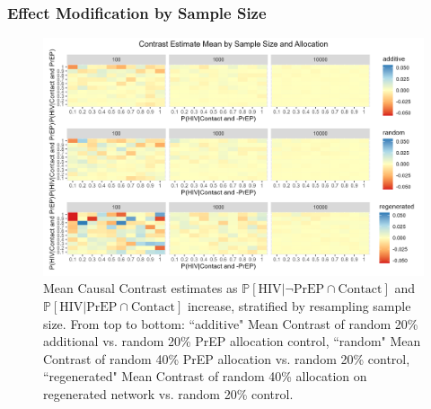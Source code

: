 \documentclass{article}
\theoremstyle{definition}
\begin{document}
\subsubsection{Effect Modification by Sample Size}
\begin{figure}[H]
    \centering
    \includegraphics[width=\linewidth]{Figures/Sample size Mean plots.png}
    \caption{Mean Causal Contrast estimates as $\mathbb{P}\left[\text{HIV} \vert \neg \text{PrEP} \cap \text{Contact}\right]$ and $\mathbb{P}\left[\text{HIV} \vert \text{PrEP} \cap \text{Contact}\right]$ increase, stratified by resampling sample size. From top to bottom: ``additive" Mean Contrast of random 20\% additional vs. random 20\% PrEP allocation control, ``random" Mean Contrast of random 40\% PrEP allocation vs. random 20\% control, ``regenerated" Mean Contrast of random 40\% allocation on regenerated network vs. random 20\% control.}
    \label{fig:Figure S4.3}
\end{figure}
\end{document}
